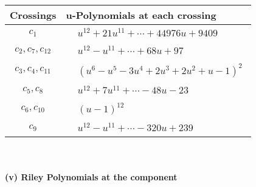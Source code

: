 \documentclass[1p]{elsarticle_modified}
\theoremstyle{definition}
\begin{document}
\begin{tabular}{m{50pt}|m{274pt}}
Crossings & \hspace{64pt}u-Polynomials at each crossing \\
\hline $$\begin{aligned}c_{1}\end{aligned}$$&$\begin{aligned}
&u^{12}+21 u^{11}+\cdots+44976 u+9409
\end{aligned}$\\
\hline $$\begin{aligned}c_{2},c_{7},c_{12}\end{aligned}$$&$\begin{aligned}
&u^{12}- u^{11}+\cdots+68 u+97
\end{aligned}$\\
\hline $$\begin{aligned}c_{3},c_{4},c_{11}\end{aligned}$$&$\begin{aligned}
&(u^6- u^5-3 u^4+2 u^3+2 u^2+u-1)^2
\end{aligned}$\\
\hline $$\begin{aligned}c_{5},c_{8}\end{aligned}$$&$\begin{aligned}
&u^{12}+7 u^{11}+\cdots-48 u-23
\end{aligned}$\\
\hline $$\begin{aligned}c_{6},c_{10}\end{aligned}$$&$\begin{aligned}
&(u-1)^{12}
\end{aligned}$\\
\hline $$\begin{aligned}c_{9}\end{aligned}$$&$\begin{aligned}
&u^{12}- u^{11}+\cdots-320 u+239
\end{aligned}$\\
\hline
\end{tabular}\\~\\
\newpage\renewcommand{\arraystretch}{1}
\flushleft \textbf{(v) Riley Polynomials at the component}\newline \\
\end{document}

